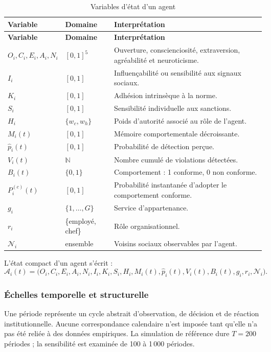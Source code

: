 \documentclass[11pt,a4paper]{article}
\begin{document}
\begin{longtable}{L{31mm}L{34mm}L{72mm}}
\caption{Variables d’état d’un agent}\label{tab:state}\\
\toprule
{}
\color{white}\textbf{Variable} &
\color{white}\textbf{Domaine} &
\color{white}\textbf{Interprétation}\\
\midrule
\endfirsthead
\toprule
{}
\color{white}\textbf{Variable} &
\color{white}\textbf{Domaine} &
\color{white}\textbf{Interprétation}\\
\midrule
\endhead
$O_i,C_i,E_i,A_i,N_i$ & $[0,1]^5$ &
Ouverture, conscienciosité, extraversion, agréabilité et neuroticisme.\\
$I_i$ & $[0,1]$ & Influençabilité ou sensibilité aux signaux sociaux.\\
$K_i$ & $[0,1]$ & Adhésion intrinsèque à la norme.\\
$S_i$ & $[0,1]$ & Sensibilité individuelle aux sanctions.\\
$H_i$ & $\{w_c,w_h\}$ & Poids d’autorité associé au rôle de l’agent.\\
$M_i(t)$ & $[0,1]$ & Mémoire comportementale décroissante.\\
$\widehat p_i(t)$ & $[0,1]$ & Probabilité de détection perçue.\\
$V_i(t)$ & $\mathbb{N}$ & Nombre cumulé de violations détectées.\\
$B_i(t)$ & $\{0,1\}$ & Comportement : 1 conforme, 0 non conforme.\\
$P_i^{(c)}(t)$ & $[0,1]$ & Probabilité instantanée d’adopter le comportement conforme.\\
$g_i$ & $\{1,\ldots,G\}$ & Service d’appartenance.\\
$r_i$ & \{employé, chef\} & Rôle organisationnel.\\
$\mathcal{N}_i$ & ensemble & Voisins sociaux observables par l’agent.\\
\bottomrule
\end{longtable}

L’état compact d’un agent s’écrit :
\[
\mathcal{A}_i(t)=
\bigl(O_i,C_i,E_i,A_i,N_i,I_i,K_i,S_i,H_i,M_i(t),
\widehat p_i(t),V_i(t),B_i(t),g_i,r_i,\mathcal{N}_i\bigr).
\]

\subsubsection{Échelles temporelle et structurelle}

Une période représente un cycle abstrait d’observation, de décision et de
réaction institutionnelle. Aucune correspondance calendaire n’est imposée tant
qu’elle n’a pas été reliée à des données empiriques. La simulation de référence
dure $T=200$ périodes ; la sensibilité est examinée de 100 à 1\,000 périodes.
\end{document}
